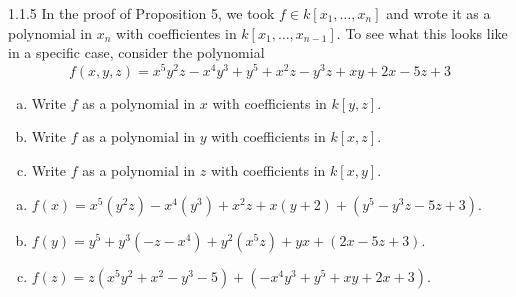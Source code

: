 \documentclass[twoside]{article}
\begin{document}
\begin{ejercicio}{1.1.5}
In the proof of Proposition 5, we took $f \in k[x_1,\dots,x_n]$ and wrote it as a polynomial in $x_n$ with coefficientes in $k[x_1,\dots,x_{n-1}]$.
To see what this looks like in a specific case, consider the polynomial
\[ f(x,y,z) = x^5y^2z-x^4y^3+y^5+x^2z-y^3z+xy+2x-5z+3 \]
\begin{enumerate}[a.]
\item Write $f$ as a polynomial in $x$ with coefficients in $k[y,z]$.
\item Write $f$ as a polynomial in $y$ with coefficients in $k[x,z]$.
\item Write $f$ as a polynomial in $z$ with coefficients in $k[x,y]$.
\end{enumerate}
\end{ejercicio}
\begin{solucion}
\begin{enumerate}[a.]
\item $f(x)=x^5(y^2z)-x^4(y^3)+x^2z+x(y+2)+(y^5-y^3z-5z+3)$.
\item $f(y)=y^5+y^3(-z-x^4)+y^2(x^5z)+yx+(2x-5z+3)$.
\item $f(z)=z(x^5y^2+x^2-y^3-5)+(-x^4y^3+y^5+xy+2x+3)$.
\end{enumerate}
\end{solucion}
\end{document}
